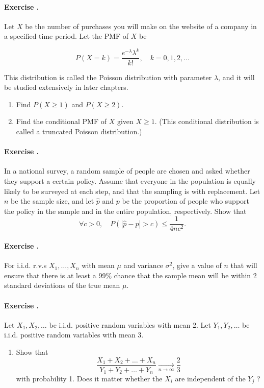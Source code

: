 \documentclass[twocolumn,12pt,a4paper]{article}
\newcounter{num}  %
\begin{document}
	\paragraph{Exercise \thenum.}
	Let \( X \) be the number of purchases you will make on the website of a company in a specified time period. Let the PMF of \( X \) be
	
	\[
	P(X = k) = \frac{e^{-\lambda} \lambda^k}{k!}, \quad k = 0, 1, 2, \dots
	\]
	
	This distribution is called the Poisson distribution with parameter \( \lambda \), and it will be studied extensively in later chapters.
	\begin{enumerate}
		\item Find \( P(X \geq 1) \) and \( P(X \geq 2) \). %
		
		\item Find the conditional PMF of \( X \) given \( X \geq 1 \). (This conditional distribution is called a truncated Poisson distribution.)
	\end{enumerate}
	
	
	\paragraph{Exercise \thenum.}
	In a national survey, a random sample of people are chosen and asked whether they support a certain policy. 
	Assume that everyone in the population is equally likely to
	be surveyed at each step, and that the sampling is with replacement.
	Let $n$ be the sample size, and let $\hat p$ and $p$ be the proportion of people who support the policy in the sample
	and in the entire population, respectively. 
	Show that
	\begin{equation}
		\forall c>0, \quad P(|\hat p - p|>c) \leq \frac{1}{4nc^2}.
	\end{equation}
	
	\paragraph{Exercise \thenum.}
	For i.i.d. r.v.s $X_1,\ldots , X_n$ with mean $\mu$ and variance $\sigma^2$, give a value of $n$ that will ensure that there is at least a 99\% chance that the sample mean will
	be within 2 standard deviations of the true mean $\mu$.
	
	
	\paragraph{Exercise \thenum.}
	Let $X_1, X_2,\ldots$ be i.i.d. positive random variables with mean 2. 
	Let $Y_1, Y_2,\ldots$ be i.i.d. positive random variables with mean 3. 
	\begin{enumerate}
		\item Show that
		$$
		\frac{X_1+X_2+\ldots+X_n}{Y_1+Y_2+\ldots+Y_n}\underset{n\rightarrow\infty}{\rightarrow} \frac{2}{3}
		$$
		with probability 1. 
		Does it matter whether the $X_i$ are independent of the $Y_j$ ?
	\end{enumerate}
	
\end{document}
